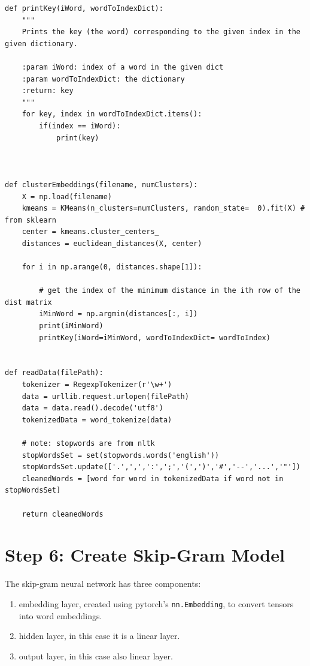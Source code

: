 \documentclass[
]{article}
\providecommand{\tightlist}{%
  \setlength{\itemsep}{0pt}\setlength{\parskip}{0pt}}
\begin{document}
\begin{verbatim}
def printKey(iWord, wordToIndexDict):
    """
    Prints the key (the word) corresponding to the given index in the given dictionary.

    :param iWord: index of a word in the given dict
    :param wordToIndexDict: the dictionary
    :return: key
    """
    for key, index in wordToIndexDict.items():
        if(index == iWord):
            print(key)



def clusterEmbeddings(filename, numClusters):
    X = np.load(filename)
    kmeans = KMeans(n_clusters=numClusters, random_state=  0).fit(X) # from sklearn
    center = kmeans.cluster_centers_
    distances = euclidean_distances(X, center)

    for i in np.arange(0, distances.shape[1]):

        # get the index of the minimum distance in the ith row of the dist matrix
        iMinWord = np.argmin(distances[:, i])
        print(iMinWord)
        printKey(iWord=iMinWord, wordToIndexDict= wordToIndex)


def readData(filePath):
    tokenizer = RegexpTokenizer(r'\w+')
    data = urllib.request.urlopen(filePath)
    data = data.read().decode('utf8')
    tokenizedData = word_tokenize(data)

    # note: stopwords are from nltk
    stopWordsSet = set(stopwords.words('english'))
    stopWordsSet.update(['.',',',':',';','(',')','#','--','...','"'])
    cleanedWords = [word for word in tokenizedData if word not in stopWordsSet]

    return cleanedWords
\end{verbatim}

\hypertarget{step-6-create-skip-gram-model}{%
\section{Step 6: Create Skip-Gram
Model}\label{step-6-create-skip-gram-model}}

The skip-gram neural network has three components:

\begin{enumerate}
\def\labelenumi{\arabic{enumi}.}
\tightlist
\item
  embedding layer, created using pytorch's \texttt{nn.Embedding}, to
  convert tensors into word embeddings.
\item
  hidden layer, in this case it is a linear layer.
\item
  output layer, in this case also linear layer.
\end{enumerate}
\end{document}
